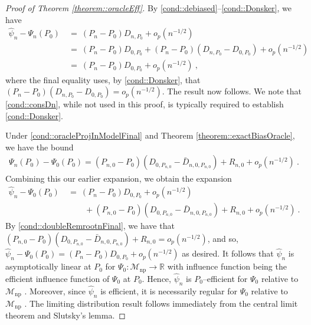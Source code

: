 \documentclass[11pt]{article}
\theoremstyle{definition}
\begin{document}
\begin{proof}[Proof of Theorem  \ref{theorem::oracleEff}]

By \ref{cond::debiased}--\ref{cond::Donsker}, we have
\begin{align*}
    \widehat{\psi}_n - \Psi_n(P_0)\ &=\ (P_n-P_0 )D_{n, P_0} + o_p(n^{-1/2}) \\  
    & =\  (P_n-P_0 )D_{0,P_0} + (P_n-P_0 )(D_{n, P_0} - D_{0,P_0}) + o_p(n^{-1/2}) \\
     & =\  (P_n-P_0 )D_{0,P_0} + o_p(n^{-1/2})\ ,
\end{align*}
where the final equality uses,  by \ref{cond::Donsker}, that $(P_n-P_0 )(D_{n, P_0} - D_{0,P_0}) = o_p(n^{-1/2})$. The result now follows. We note that \ref{cond::consDn}, while not used in this proof, is typically required to establish \ref{cond::Donsker}.


 


 
Under \ref{cond::oracleProjInModelFinal} and Theorem \ref{theorem::exactBiasOracle}, we have the bound
\begin{align*}
        \Psi_n(P_0) - \Psi_0(P_0)=  (P_{n,0}- P_0) ( D_{0,P_{n,0}} - \bar{D}_{n, 0,P_{n,0}}) + R_{n,0}  + o_p(n^{-1/2})\ .   
\end{align*}
 Combining this our earlier expansion, we obtain the expansion
\begin{align*}
    \widehat{\psi}_n - \Psi_0(P_0)\ & =\ (P_n-P_0 )D_{0,P_0}  + o_p(n^{-1/2})\\
    & \qquad + (P_{n,0} - P_0)( D_{0,P_{n,0}} - \bar{D}_{n, 0,P_{n,0}}) + R_{n,0} + o_p(n^{-1/2})\ .
\end{align*}
By \ref{cond::doubleRemrootnFinal}, we have that $ (P_{n,0} - P_0)( D_{0,P_{n,0}} - \bar{D}_{n, 0,P_{n,0}}) + R_{n,0} = o_p(n^{-1/2})$, and so, $  \widehat{\psi}_n - \Psi_0(P_0)  = (P_n-P_0 )D_{0,P_0}  + o_p(n^{-1/2})$ as desired. It follows that $\widehat{\psi}_n $ is asymptotically linear at $P_0$ for $\Psi_0:\mathcal{M}_{\mathrm{np}} \rightarrow \mathbb{R}$ with influence function being the efficient influence function of $\Psi_0$ at $P_0$. Hence, $\widehat{\psi}_n $ is $P_0$--efficient for $\Psi_0$ relative to $\mathcal{M}_{\mathrm{np}}$ \citep{bickel1993efficient}. Moreover, since  $\widehat{\psi}_n $ is efficient, it is necessarily regular for $\Psi_0$ relative to $\mathcal{M}_{\mathrm{np}}$ \citep{vandervaart2000asymptotic}. The limiting distribution result follows immediately from the central limit theorem and Slutsky's lemma.\end{proof}
\end{document}
